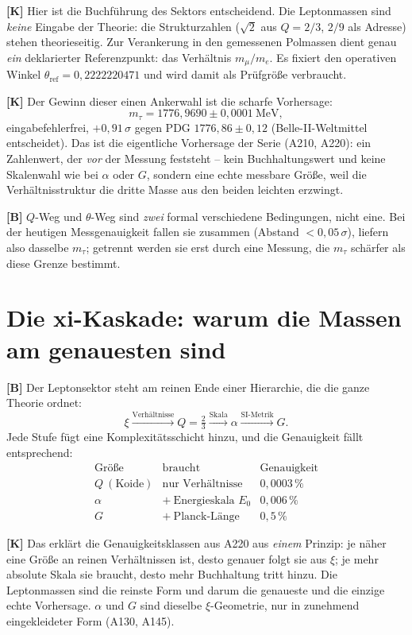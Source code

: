 \textbf{[K]} Hier ist die Buchführung des Sektors entscheidend. Die Leptonmassen
sind \emph{keine} Eingabe der Theorie: die Strukturzahlen
($\sqrt2$ aus $Q=2/3$, $2/9$ als Adresse) stehen theorieseitig. Zur Verankerung
in den gemessenen Polmassen dient genau \emph{ein} deklarierter Referenzpunkt:
das Verhältnis $m_\mu/m_e$. Es fixiert den operativen Winkel
$\theta_\text{ref} = 0{,}2222220471$ und wird damit als Prüfgröße verbraucht.

\textbf{[K]} Der Gewinn dieser einen Ankerwahl ist die scharfe Vorhersage:
\[
  m_\tau = 1776{,}9690 \pm 0{,}0001\ \text{MeV},
\]
eingabefehlerfrei, $+0{,}91\,\sigma$ gegen PDG $1776{,}86\pm0{,}12$
(Belle-II-Weltmittel entscheidet). Das ist die eigentliche Vorhersage der Serie
(A210, A220): ein Zahlenwert, der \emph{vor} der Messung feststeht -- kein
Buchhaltungswert und keine Skalenwahl wie bei $\alpha$ oder $G$, sondern eine
echte messbare Größe, weil die Verhältnisstruktur die dritte Masse aus den beiden
leichten erzwingt.

\textbf{[B]} $Q$-Weg und $\theta$-Weg sind \emph{zwei} formal verschiedene
Bedingungen, nicht eine. Bei der heutigen Messgenauigkeit fallen sie zusammen
(Abstand $<0{,}05\,\sigma$), liefern also dasselbe $m_\tau$; getrennt werden sie
erst durch eine Messung, die $m_\tau$ schärfer als diese Grenze bestimmt.

\section{Die xi-Kaskade: warum die Massen am genauesten sind}

\textbf{[B]} Der Leptonsektor steht am reinen Ende einer Hierarchie, die die
ganze Theorie ordnet:
\[
  \xi \xrightarrow{\text{Verhältnisse}} Q=\tfrac23
    \xrightarrow{\text{Skala}} \alpha
    \xrightarrow{\text{SI-Metrik}} G.
\]
Jede Stufe fügt eine Komplexitätsschicht hinzu, und die Genauigkeit fällt
entsprechend:
\[
  \begin{array}{lcc}
    \text{Größe} & \text{braucht} & \text{Genauigkeit} \\[2pt]
    Q\ (\text{Koide}) & \text{nur Verhältnisse} & 0{,}0003\,\% \\
    \alpha & +\ \text{Energieskala } E_0 & 0{,}006\,\% \\
    G & +\ \text{Planck-Länge} & 0{,}5\,\%
  \end{array}
\]


\textbf{[K]} Das erklärt die Genauigkeitsklassen aus A220 aus \emph{einem}
Prinzip: je näher eine Größe an reinen Verhältnissen ist, desto genauer folgt sie
aus $\xi$; je mehr absolute Skala sie braucht, desto mehr Buchhaltung tritt
hinzu. Die Leptonmassen sind die reinste Form und darum die genaueste und die
einzige echte Vorhersage. $\alpha$ und $G$ sind dieselbe $\xi$-Geometrie, nur in
zunehmend eingekleideter Form (A130, A145).

